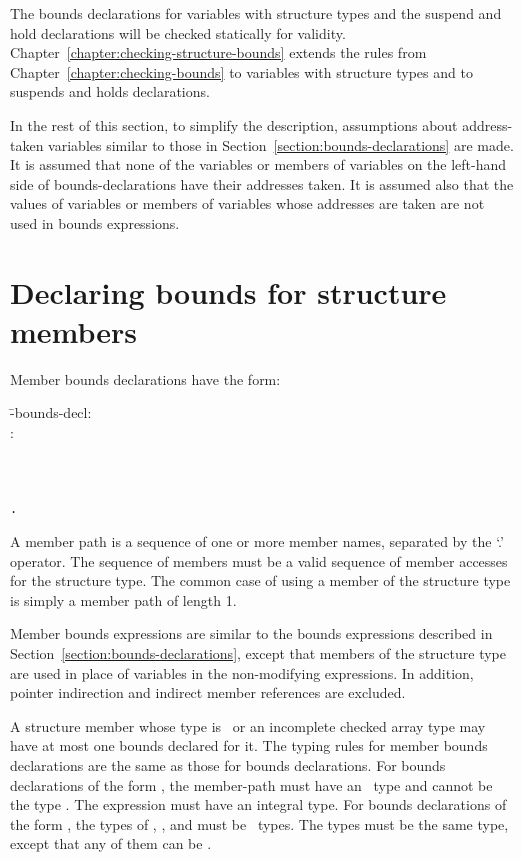 The bounds declarations for variables with structure types and the
suspend and hold declarations will be checked statically for validity.
Chapter~\ref{chapter:checking-structure-bounds} extends the rules 
from Chapter~\ref{chapter:checking-bounds}
to variables with structure
types and to suspends and holds declarations.

In the rest of this section, to simplify the description, assumptions
about address-taken variables similar to those in
Section~\ref{section:bounds-declarations} are made.
It is assumed that none of the variables or members of variables on the
left-hand side of bounds-declarations have their addresses taken. It is
assumed also that the values of variables or members of variables whose
addresses are taken are not used in bounds expressions.

\section{Declaring bounds for structure members}

Member bounds declarations have the form:
\begin{tabbing}
\={-bounds-decl:}\\
\>  :  \\
\\
\\
\>  \\
\>  \texttt{.} 
\end{tabbing}

A member path is a sequence of one or more member names, separated by
the `.' operator. The sequence of members must be a valid sequence of
member accesses for the structure type. The common case of using a
member of the structure type is simply a member path of length 1.

Member bounds expressions are similar to the bounds expressions
described in Section~\ref{section:bounds-declarations}, 
except that members of the structure type are
used in place of variables in the non-modifying expressions. In
addition, pointer indirection and indirect member references are
excluded.

A structure member whose type is \arrayptr\ or an incomplete
checked array type may have at most one bounds declared for it. The
typing rules for member bounds declarations are the same as those for
bounds declarations. For bounds declarations of the form
, the
member-path must have an \arrayptr\ type and cannot be the type
\arrayptrvoid. The expression
 must have an integral type. For bounds declarations of the
form , 
the types of , , and 
must be \arrayptr\ types. The types must be the same type,
except that any of them can be
\arrayptrvoid.

